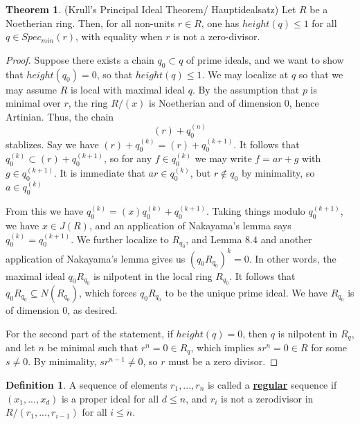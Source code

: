 \documentclass{article}
\theoremstyle{definition}
\newtheorem{theorem}{Theorem}[section]
\theoremstyle{definition}
\theoremstyle{definition}
\theoremstyle{definition}
\theoremstyle{definition}
\newtheorem{definition}{Definition}[section]
\theoremstyle{definition}
\theoremstyle{definition}
\begin{document}
\begin{tcolorbox}[colback=red!5!white,colframe=red!30!white]
\begin{theorem}
(Krull's Principal Ideal Theorem/ Hauptidealsatz) Let $R$ be a Noetherian ring. Then, for all non-units $r\in R$, one has $height(q)\leq 1$ for all $q\in Spec_{min}(r)$, with equality when $r$ is not a zero-divisor.
\end{theorem}
\end{tcolorbox}
\begin{proof}
    Suppose there exists a chain $q_0\subset q$ of prime ideals, and we want to show that $height(q_0)=0$, so that $height(q)\leq 1$. We may localize at $q$ so that we may assume $R$ is local with maximal ideal $q$. By the assumption that $p$ is minimal over $r$, the ring $R/(x)$ is Noetherian and of dimension $0$, hence Artinian. Thus, the chain 
    \[(r)+q_0^{(n)}\]
    stablizes. Say we have $(r)+q_0^{(k)}=(r)+q_0^{(k+1)}$. It follows that $q_0^{(k)}\subset (r)+q_0^{(k+1)}$, so for any $f\in q_0^{(k)}$ we may write $f=ar+g$ with $g\in q_0^{(k+1)}$. It is immediate that $ar\in q_0^{(k)}$, but $r\not \in q_0$ by minimality, so $a\in q_0^{(k)}$
    
    From this we have $q_0^{(k)}=(x)q_0^{(k)}+q_0^{(k+1)}$. Taking things modulo $q_0^{(k+1)}$, we have $x\in J(R)$, and an application of Nakayama's lemma says $q_0^{(k)}=q_0^{(k+1)}$. We further localize to $R_{q_0}$, and Lemma $8.4$ and another application of  Nakayama's lemma gives us $(q_0R_{q_0})^k=0$. In other words, the maximal ideal $q_0R_{q_0}$ is nilpotent in the local ring $R_{q_0}$. It follows that $q_0R_{q_0}\subseteq N(R_{q_0})$, which forces $q_0R_{q_0}$ to be the unique prime ideal. We have $R_{q_0}$ is of dimension $0$, as desired. 

    For the second part of the statement, if $height(q)=0$, then $q$ is nilpotent in $R_q$, and let $n$ be minimal such that $r^n=0\in R_q$, which implies $sr^n=0\in R$ for some $s\neq 0$. By minimality, $sr^{n-1}\neq 0$, so $r$ must be a zero divisor. 

\end{proof}






\begin{tcolorbox}[colback=purple!5!white,colframe=purple!75!black]
\begin{definition}
A sequence of elements $r_1,...,r_n$ is called a \underline{\textbf{regular}} sequence if $(x_1,...,x_d)$ is a proper ideal for all $d\leq n$, and $r_i$ is not a zerodivisor in $R/(r_1,...,r_{i-1})$ for all $i\leq n$. 
\end{definition}
\end{tcolorbox}
\end{document}
